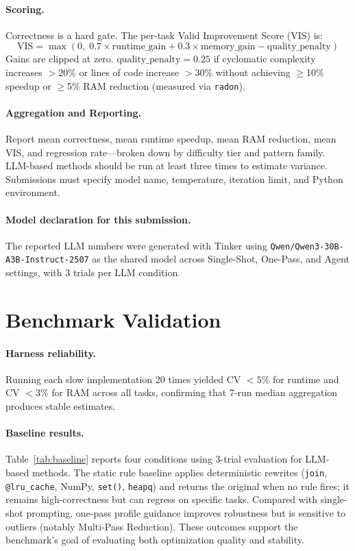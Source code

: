 \documentclass{article}
\begin{document}
\paragraph{Scoring.} Correctness is a hard gate. The per-task Valid Improvement Score (VIS) is:
\begin{equation}
\text{VIS} = \max\!\left(0,\; 0.7\times\text{runtime\_gain} + 0.3\times\text{memory\_gain} - \text{quality\_penalty}\right)
\end{equation}
Gains are clipped at zero. $\text{quality\_penalty}=0.25$ if cyclomatic complexity increases $>$20\% or lines of code increase $>$30\% without achieving $\geq$10\% speedup or $\geq$5\% RAM reduction (measured via \texttt{radon}).

\paragraph{Aggregation and Reporting.} Report mean correctness, mean runtime speedup, mean RAM reduction, mean VIS, and regression rate---broken down by difficulty tier and pattern family. LLM-based methods should be run at least three times to estimate variance. Submissions must specify model name, temperature, iteration limit, and Python environment.

\paragraph{Model declaration for this submission.} The reported LLM numbers were generated with Tinker using \texttt{Qwen/Qwen3-30B-A3B-Instruct-2507} as the shared model across Single-Shot, One-Pass, and Agent settings, with 3 trials per LLM condition.

\section{Benchmark Validation}

\paragraph{Harness reliability.} Running each slow implementation 20 times yielded CV $<5\%$ for runtime and CV $<3\%$ for RAM across all tasks, confirming that 7-run median aggregation produces stable estimates.

\paragraph{Baseline results.} Table~\ref{tab:baseline} reports four conditions using 3-trial evaluation for LLM-based methods. The static rule baseline applies deterministic rewrites (\texttt{join}, \texttt{@lru\_cache}, NumPy, \texttt{set()}, \texttt{heapq}) and returns the original when no rule fires; it remains high-correctness but can regress on specific tasks. Compared with single-shot prompting, one-pass profile guidance improves robustness but is sensitive to outliers (notably Multi-Pass Reduction). These outcomes support the benchmark's goal of evaluating both optimization quality and stability.
\end{document}
